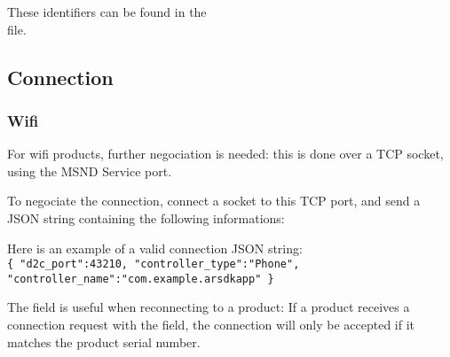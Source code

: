 These identifiers can be found in the \\
 file.

\newpage

\subsection{Connection}

\subsubsection{Wifi}

For wifi products, further negociation is needed: this is done over a TCP socket, using the MSND Service port.

To negociate the connection, connect a socket to this TCP port, and send a JSON string containing the following informations:
\begin{table}[h]
\centering
{}
\caption{Available keys for connection JSON}
\end{table}

Here is an example of a valid connection JSON string:\\
\texttt{\{ "d2c\_port":43210, "controller\_type":"Phone", \\
"controller\_name":"com.example.arsdkapp" \}}


The  field is useful when reconnecting to a product: If a product receives a connection request with the  field, the connection will only be accepted if it matches the product serial number.

\newpage

